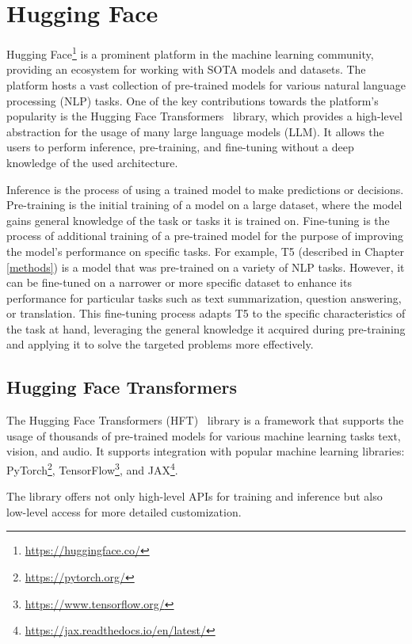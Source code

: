 \documentclass[english, ba, kiv, he, iso690numb, pdf, viewonly]{fasthesis}
\begin{document}
\section{Hugging Face} \label{hf}
Hugging Face\footnote{\url{https://huggingface.co/}} is a prominent platform in the machine learning community, providing an ecosystem for working with SOTA models and datasets. The platform hosts a vast collection of pre-trained models for various natural language processing (NLP) tasks. One of the key contributions towards the platform's popularity is the Hugging Face Transformers~\cite{wolf-etal-2020-transformers} library, which provides a high-level abstraction for the usage of many large language models (LLM). It allows the users to perform inference, pre-training, and fine-tuning without a deep knowledge of the used architecture. 

Inference is the process of using a trained model to make predictions or decisions. Pre-training is the initial training of a model  on a large dataset, where the model gains general knowledge of the task or tasks it is trained on. Fine-tuning is the process of additional training of a pre-trained model for the purpose of improving the model's performance on specific tasks. For example, T5 (described in Chapter \ref{methods}) is a model that was pre-trained on a variety of NLP tasks. However, it can be fine-tuned on a narrower or more specific dataset to enhance its performance for particular tasks such as text summarization, question answering, or translation. This fine-tuning process adapts T5 to the specific characteristics of the task at hand, leveraging the general knowledge it acquired during pre-training and applying it to solve the targeted problems more effectively.
\subsection{Hugging Face Transformers}
The Hugging Face Transformers (HFT)~\cite{wolf-etal-2020-transformers} library is a framework that supports the usage of thousands of pre-trained models for various machine learning tasks text, vision, and audio. It supports integration with popular machine learning libraries: PyTorch\footnote{\url{https://pytorch.org/}}, TensorFlow\footnote{\url{https://www.tensorflow.org/}}, and JAX\footnote{\url{https://jax.readthedocs.io/en/latest/}}.

The library offers not only high-level APIs for training and inference but also low-level access for more detailed customization.
\end{document}
